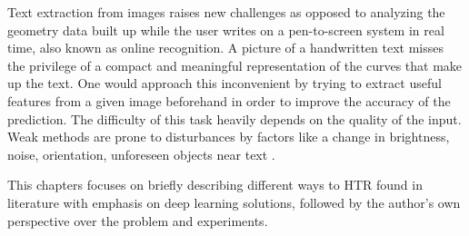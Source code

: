 \par Text extraction from images raises new challenges as opposed to analyzing the geometry data built up while the user writes on a pen-to-screen system in real time, also known as online recognition. A picture of a handwritten text misses the privilege of a compact and meaningful representation of the curves that make up the text. One would approach this inconvenient by trying to extract useful features \cite{featext} from a given image beforehand in order to improve the accuracy of the prediction. The difficulty of this task heavily depends on the quality of the input. Weak methods are prone to disturbances by factors like a change in brightness, noise, orientation, unforeseen objects near text \cite{Juan}. 

This chapters focuses on briefly describing different ways to HTR found in literature with emphasis on deep learning solutions, followed by the author's own perspective over the problem and experiments.